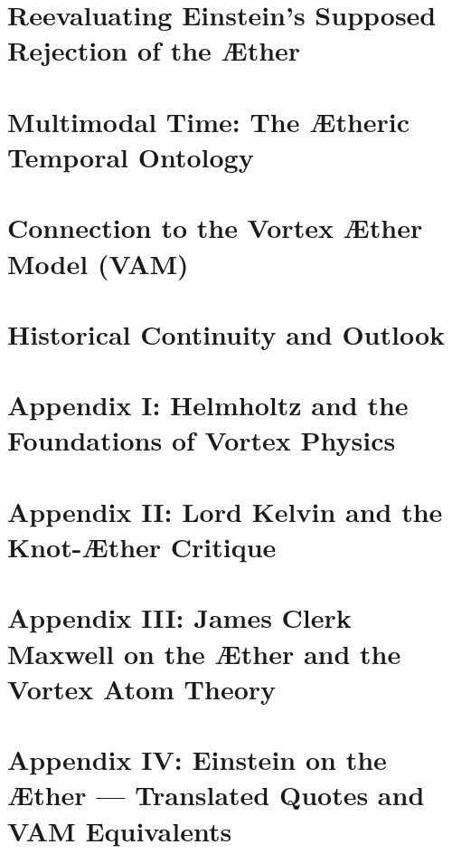 \documentclass[preprint,notitlepage]{revtex4-2}
\begin{document}
\section{Reevaluating Einstein’s Supposed Rejection of the Æther}


\section{Multimodal Time: The Ætheric Temporal Ontology}


\section{Connection to the Vortex Æther Model (VAM)}


\section{Historical Continuity and Outlook}


\appendix

\section*{Appendix I: Helmholtz and the Foundations of Vortex Physics}
\label{appendix:helmholtz}



\section*{Appendix II: Lord Kelvin and the Knot-Æther Critique}
\label{appendix:kelvin}



\section*{Appendix III: James Clerk Maxwell on the Æther and the Vortex Atom Theory}
\label{appendix:maxwell}


\section*{Appendix IV: Einstein on the Æther — Translated Quotes and VAM Equivalents}
\label{appendix:einstein}

\end{document}
